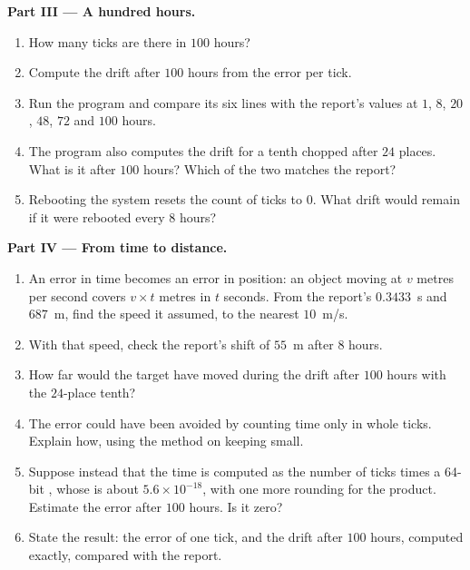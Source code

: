 \begin{problem}
\medskip\noindent\textbf{Part III --- A hundred hours.}
\begin{enumerate}[resume]
  \item How many ticks are there in $100$ hours?
  \item Compute the drift after $100$ hours from the error per tick.
  \item Run the program and compare its six lines with the report's values at $1$, $8$, $20$, $48$, $72$ and $100$
    hours.
  \item The program also computes the drift for a tenth chopped after $24$ places. What is it after $100$ hours?
    Which of the two matches the report?
  \item Rebooting the system resets the count of ticks to $0$. What drift would remain if it were rebooted every $8$
    hours?
\end{enumerate}

\medskip\noindent\textbf{Part IV --- From time to distance.}
\begin{enumerate}[resume]
  \item An error in time becomes an error in position: an object moving at $v$ metres per second covers $v \times t$
    metres in $t$ seconds. From the report's $0.3433$~s and $687$~m, find the speed it assumed, to the nearest
    $10$~m/s.
  \item With that speed, check the report's shift of $55$~m after $8$ hours.
  \item How far would the target have moved during the drift after $100$ hours with the $24$-place tenth?
  \item The error could have been avoided by counting time only in whole ticks. Explain how, using the method on
    keeping  small.
  \item Suppose instead that the time is computed as the number of ticks times a 64-bit , whose  is about $5.6 \times 10^{-18}$, with one more rounding for the product. Estimate the error after $100$
    hours. Is it zero?
  \item State the result: the error of one tick, and the drift after $100$ hours, computed exactly, compared with the
    report.
\end{enumerate}
\end{problem}
